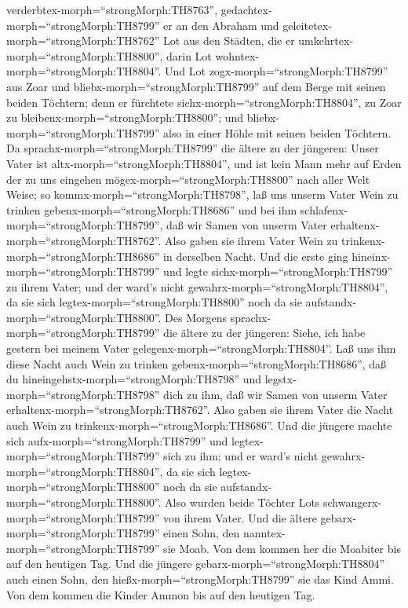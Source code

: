 verderbtex-morph=``strongMorph:TH8763'',
gedachtex-morph=``strongMorph:TH8799'' er an den Abraham und
geleitetex-morph=``strongMorph:TH8762'' Lot aus den Städten, die er
umkehrtex-morph=``strongMorph:TH8800'', darin Lot
wohntex-morph=``strongMorph:TH8804''.  Und Lot
zogx-morph=``strongMorph:TH8799'' aus Zoar und
bliebx-morph=``strongMorph:TH8799'' auf dem Berge mit seinen beiden
Töchtern; denn er fürchtete sichx-morph=``strongMorph:TH8804'', zu Zoar
zu bleibenx-morph=``strongMorph:TH8800''; und
bliebx-morph=``strongMorph:TH8799'' also in einer Höhle mit seinen
beiden Töchtern.  Da sprachx-morph=``strongMorph:TH8799''
die ältere zu der jüngeren: Unser Vater ist
altx-morph=``strongMorph:TH8804'', und ist kein Mann mehr auf Erden der
zu uns eingehen mögex-morph=``strongMorph:TH8800'' nach aller Welt
Weise;  so kommx-morph=``strongMorph:TH8798'', laß uns
unserm Vater Wein zu trinken gebenx-morph=``strongMorph:TH8686'' und bei
ihm schlafenx-morph=``strongMorph:TH8799'', daß wir Samen von unserm
Vater erhaltenx-morph=``strongMorph:TH8762''.  Also gaben
sie ihrem Vater Wein zu trinkenx-morph=``strongMorph:TH8686'' in
derselben Nacht. Und die erste ging hineinx-morph=``strongMorph:TH8799''
und legte sichx-morph=``strongMorph:TH8799'' zu ihrem Vater; und der
ward's nicht gewahrx-morph=``strongMorph:TH8804'', da sie sich
legtex-morph=``strongMorph:TH8800'' noch da sie
aufstandx-morph=``strongMorph:TH8800''.  Des Morgens
sprachx-morph=``strongMorph:TH8799'' die ältere zu der jüngeren: Siehe,
ich habe gestern bei meinem Vater gelegenx-morph=``strongMorph:TH8804''.
Laß uns ihm diese Nacht auch Wein zu trinken
gebenx-morph=``strongMorph:TH8686'', daß du
hineingehstx-morph=``strongMorph:TH8798'' und
legstx-morph=``strongMorph:TH8798'' dich zu ihm, daß wir Samen von
unserm Vater erhaltenx-morph=``strongMorph:TH8762''.  Also
gaben sie ihrem Vater die Nacht auch Wein zu
trinkenx-morph=``strongMorph:TH8686''. Und die jüngere machte sich
aufx-morph=``strongMorph:TH8799'' und
legtex-morph=``strongMorph:TH8799'' sich zu ihm; und er ward's nicht
gewahrx-morph=``strongMorph:TH8804'', da sie sich
legtex-morph=``strongMorph:TH8800'' noch da sie
aufstandx-morph=``strongMorph:TH8800''.  Also wurden beide
Töchter Lots schwangerx-morph=``strongMorph:TH8799'' von ihrem Vater.
 Und die ältere gebarx-morph=``strongMorph:TH8799'' einen
Sohn, den nanntex-morph=``strongMorph:TH8799'' sie Moab. Von dem kommen
her die Moabiter bis auf den heutigen Tag.  Und die jüngere
gebarx-morph=``strongMorph:TH8804'' auch einen Sohn, den
hießx-morph=``strongMorph:TH8799'' sie das Kind Ammi. Von dem kommen die
Kinder Ammon bis auf den heutigen Tag.


